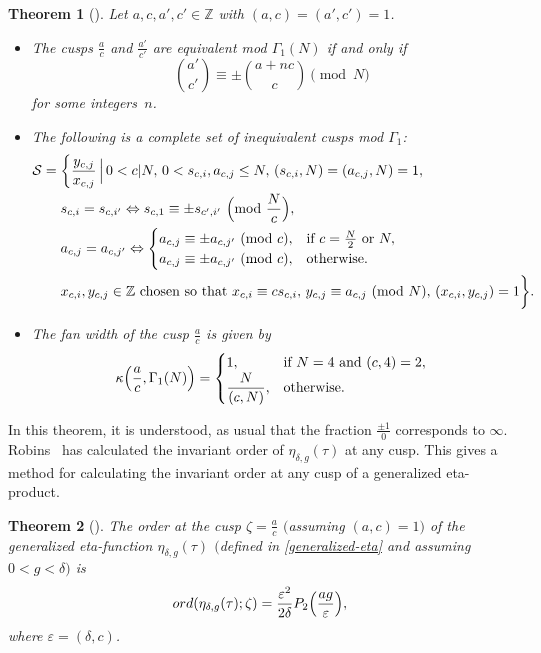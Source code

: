 \documentclass[pdftex]{sigma}
\numberwithin{equation}{section}
\newtheorem{Theorem}{Theorem}[section]
\theoremstyle{definition}
\begin{document}
\begin{Theorem}[{\cite[Corollary 4]{CKP09}}]\label{Thm-2.2}
Let $a, c, a', c'\in\mathbb{Z}$ with $(a, c)=(a', c')=1$.
\begin{itemize}\itemsep=0pt
 \item[$(i)$] The cusps $\frac{a}{c}$ and $\frac{a'}{c'}$ are equivalent mod $\Gamma_1(N)$ if and only if \[ \binom{a'}{c'}\equiv \pm\binom{a+nc}{c} \pmod N \] for some integers~$n$.
 \item[$(ii)$] The following is a complete set of inequivalent cusps mod $\Gamma_{1}$:
\begin{align*}
\mathcal{S}={} &\biggl\{\frac{y_{c,j}}{x_{c,j}}\,\Bigl|\, 0 < c|N,\, 0 < s_{c,i},a_{c,j}\leq N,\, (s_{c,i},N)=(a_{c,j},N)=1,\\
&s_{c,i}=s_{c,i'}\Leftrightarrow s_{c,1}\equiv\pm s_{c',i'} \ \Big({\rm mod} \ \frac{N}{c}\Big),\\
&a_{c,j}=a_{c,j'}\Leftrightarrow \begin{cases}
a_{c,j}\equiv\pm a_{c,j'} \ ({\rm mod}~c), & \text{if}~c=\frac{N}{2}~\text{or}~ N,\\
a_{c,j}\equiv\pm a_{c,j'}\ ({\rm mod}~c), & \text{otherwise}.\end{cases}\\
&x_{c,i},y_{c,j}\in\mathbb{Z}~\text{chosen so that}~x_{c,i}\equiv cs_{c,i} ,\,  y_{c,j}\equiv a_{c,j}\ ({\rm mod}~N), \, (x_{c,i},y_{c,j})=1\biggr\}.
\end{align*}
 \item[(iii)] The fan width of the cusp $\frac{a}{c}$ is given by
\begin{align*}
\kappa\Bigl(\frac{a}{c},\Gamma_1(N)\Bigr)=\begin{cases}
1, &\text{if}~N=4~\text{and}~(c,4)=2,\\
\dfrac{N}{(c,N)}, &\text{otherwise}.\end{cases}
\end{align*}
\end{itemize}
\end{Theorem}
In this theorem, it is understood, as usual that the fraction $\frac{\pm 1}{0}$ corresponds to $\infty$. Robins~\cite{Ro94} has calculated the invariant order of $\eta_{\delta,g}(\tau)$ at any cusp. This gives a method for calculating the invariant order at any cusp of a generalized eta-product.
\begin{Theorem}[\cite{Ro94}]\label{Thm-2.3}
The order at the cusp $\zeta=\frac{a}{c}$ $($assuming $(a,c)=1)$ of the generalized eta-function $\eta_{\delta,g}(\tau)$ $($defined in \eqref{generalized-eta} and assuming $0 < g < \delta)$ is
\begin{align*}
ord(\eta_{\delta,g}(\tau);\zeta)=\frac{\varepsilon^2}{2\delta}P_2\Bigl(\frac{ag}{\varepsilon}\Bigr),
\end{align*}
where $\varepsilon=(\delta,c)$.
\end{Theorem}
\end{document}
